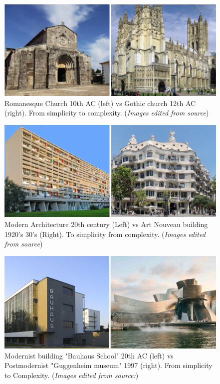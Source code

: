      \begin{figure}[htb]
          \centering
          \includegraphics[width= \linewidth]{Images/RomanesqueVsGothic}
          \caption{Romanesque Church 10th AC (left) vs Gothic church 12th AC (right). From simplicity to complexity. (\textit{Images edited from source})}
          \label{fig:RomanesquevsGothic}
        \end{figure}

     \begin{figure}[htb]
          \centering
          \includegraphics[width= \linewidth]{Images/ArtNouveauVsModernism}
          \caption{Modern Architecture 20th century (Left) vs Art Nouveau building 1920's 30's (Right). To simplicity from complexity. (\textit{Images edited from source})}
          \label{fig:ArtNouveauVsModernism}
        \end{figure}

     \begin{figure}[htb]
          \centering
          \includegraphics[width= \linewidth]{Images/modernism vs postmodernism}
          \caption{Modernist building "Bauhaus School" 20th AC (left) vs Postmodernist "Guggenheim museum" 1997 (right). From simplicity to Complexity. (\textit{Images edited from source:\cite{Arora2023}})}
          \label{fig:Modernismvscontemporary}
        \end{figure}

